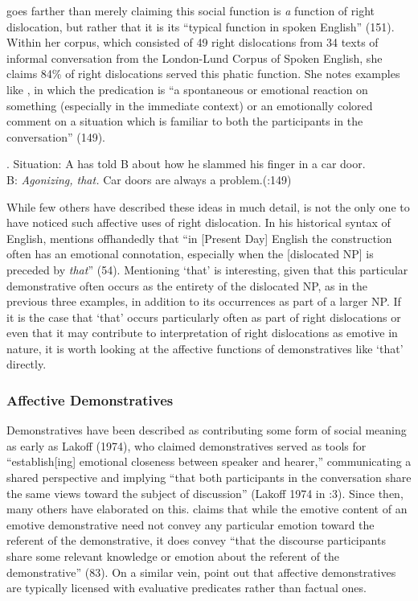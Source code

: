 \documentclass[titlepage,12pt]{article}
\begin{document}
\citeauthor{aijmer_themes_1989} goes farther than merely claiming this social function is \emph{a} function of right dislocation, but rather that it is its ``typical function in spoken English'' (151). Within her corpus, which consisted of 49 right dislocations from 34 texts of informal conversation from the London-Lund Corpus of Spoken English, she claims 84\% of right dislocations served this phatic function. She notes examples like \Next, in which the predication is ``a spontaneous or emotional reaction on something (especially in the immediate context) or an emotionally colored comment on a situation which is familiar to both the participants in the conversation'' (149).

\ex. Situation: A has told B about how he slammed his finger in a car door.\\
B: \textit{Agonizing, that.} Car doors are always a problem.\hfill (\citealt{aijmer_themes_1989}:149)

While few others have described these ideas in much detail, \citeauthor{aijmer_themes_1989} is not the only one to have noticed such affective uses of right dislocation. In his historical syntax of English, \citet{visser_historical_1963} mentions offhandedly that ``in [Present Day] English the construction often has an emotional connotation, especially when the [dislocated NP] is preceded by \textit{that}'' (54). Mentioning `that' is interesting, given that this particular demonstrative often occurs as the entirety of the dislocated NP, as in the previous three examples, in addition to its occurrences as part of a larger NP. If it is the case that `that' occurs particularly often as part of right dislocations or even that it may contribute to interpretation of right dislocations as emotive in nature, it is worth looking at the affective functions of demonstratives like `that' directly.

\subsubsection{Affective Demonstratives}

 Demonstratives have been described as contributing some form of social meaning as early as Lakoff (1974), who claimed demonstratives served as tools for ``establish[ing] emotional closeness between speaker and hearer,'' communicating a shared perspective and implying ``that both participants in the conversation share the same views toward the subject of discussion'' (Lakoff 1974 in \citealt{acton_that_2014}:3). Since then, many others have elaborated on this. \citet{wolter_thats_2006} claims that while the emotive content of an emotive demonstrative need not convey any particular emotion toward the referent of the demonstrative, it does convey ``that the discourse participants share some relevant knowledge or emotion about the referent of the demonstrative'' (83). On a similar vein, \citet{bowdle_generic_1995} point out that affective demonstratives are typically licensed with evaluative predicates rather than factual ones. 
 
\end{document}
